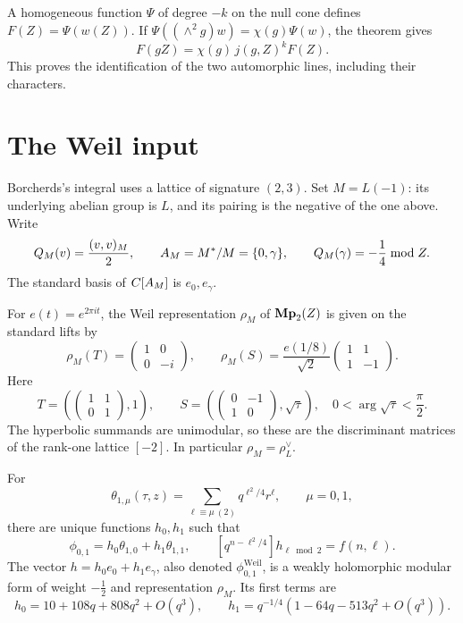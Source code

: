A homogeneous function \(\Psi\) of degree \(-k\) on the null cone
defines \(F(Z)=\Psi(w(Z))\).  If
\(\Psi((\wedge^2g)w)=\chi(g)\Psi(w)\), the theorem gives
\[
 F(gZ)=\chi(g)\,j(g,Z)^k F(Z).
\]
This proves the identification of the two automorphic lines,
including their characters.

\section{The Weil input}
\label{ssec:phi-to-weil}

Borcherds's integral uses a lattice of signature \((2,3)\).
Set \(M=L(-1)\): its underlying abelian group is \(L\), and
its pairing is the negative of the one above.  Write
\[
 Q_M(v)=\frac{(v,v)_M}{2},\qquad
 A_M=M^*/M=\{0,\gamma\},\qquad
 Q_M(\gamma)=-\frac14\bmod Z.
\]
The standard basis of \(C[A_M]\) is \(e_0,e_\gamma\).

For \(e(t)=e^{2\pi it}\), the Weil representation \(\rho_M\)
of \(\mathbf{Mp}_2(Z)\) is given on the standard lifts by
\[
 \rho_M(T)=
 \begin{pmatrix}1&0\\0&-i\end{pmatrix},\qquad
 \rho_M(S)=\frac{e(1/8)}{\sqrt2}
             \begin{pmatrix}1&1\\1&-1\end{pmatrix}.
\]
Here
\[
 T=\left(\begin{pmatrix}1&1\\0&1\end{pmatrix},1\right),\qquad
 S=\left(\begin{pmatrix}0&-1\\1&0\end{pmatrix},\sqrt{\tau}\right),
 \quad 0<\arg\sqrt{\tau}<\frac{\pi}{2}.
\]
The hyperbolic summands are unimodular, so these are the
discriminant matrices of the rank-one lattice \([-2]\).
In particular \(\rho_M=\rho_L^\vee\).

\begin{lemma}
\label{lem:theta-decomposition}
For
\[
 \theta_{1,\mu}(\tau,z)
 =\sum_{\ell\equiv\mu\ (2)}q^{\ell^2/4}r^\ell,\qquad \mu=0,1,
\]
there are unique functions \(h_0,h_1\) such that
\[
 \phi_{0,1}=h_0\theta_{1,0}+h_1\theta_{1,1},\qquad
 [q^{n-\ell^2/4}]h_{\ell\bmod2}=f(n,\ell).
\]
The vector \(h=h_0e_0+h_1e_\gamma\), also denoted
\(\phi_{0,1}^{\mathrm{Weil}}\), is a weakly holomorphic
modular form of weight \(-\tfrac12\) and representation \(\rho_M\).
Its first terms are
\[
 h_0=10+108q+808q^2+O(q^3),\qquad
 h_1=q^{-1/4}(1-64q-513q^2+O(q^3)).
\]
\end{lemma}

